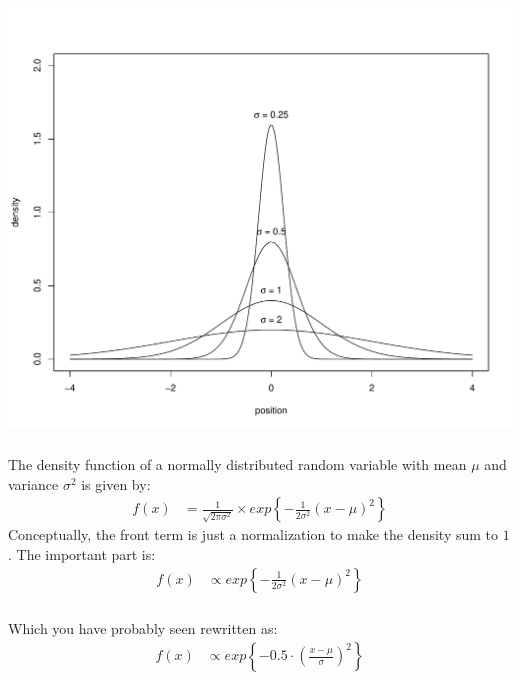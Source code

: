 \begin{frame}[fragile] \frametitle{}

\begin{center}
\includegraphics[width=\linewidth]{img/normal_density.pdf}
\end{center}

\end{frame}

\begin{frame}[fragile] \frametitle{}

The density function of a normally distributed random variable with
mean $\mu$ and variance $\sigma^2$ is given by:
\begin{align*}
f(x) &=  \frac{1}{\sqrt{2\pi\sigma^2}} \times
    exp \left\{ - \frac{1}{2\sigma^2} (x-\mu)^2 \right\}
\end{align*}
\pause Conceptually, the front term is just a normalization to make
the density sum to $1$. The important part is:
\begin{align*}
f(x) &\propto exp \left\{ - \frac{1}{2\sigma^2} (x-\mu)^2 \right\}
\end{align*}

\end{frame}

\begin{frame}[fragile] \frametitle{}

Which you have probably seen rewritten as:
\begin{align*}
f(x) &\propto exp \left\{ - 0.5 \cdot \left(\frac{x-\mu}{\sigma}\right)^2 \right\}
\end{align*}

\end{frame}

